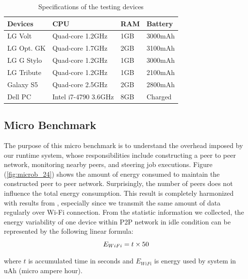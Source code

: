 \documentclass{sig-alternate}
\begin{document}
\begin{table}[h]
\caption{Specifications of the testing devices}
\label{table:devices}
\centering \small
\begin{tabular}{| l | l | l | l |}
    \hline
    \textbf{Devices} & \textbf{CPU} & \textbf{RAM} & \textbf{Battery} \\ \hline \hline
    LG Volt & Quad-core 1.2GHz & 1GB & 3000mAh\\ \hline
		LG Opt. GK & Quad-core 1.7GHz & 2GB & 3100mAh\\ \hline
		LG G Stylo & Quad-core 1.2GHz & 1GB & 3000mAh\\ \hline
		LG Tribute & Quad-core 1.2GHz & 1GB & 2100mAh\\ \hline
		Galaxy S5 & Quad-core 2.5GHz & 2GB & 2800mAh\\ \hline
		Dell PC & Intel i7-4790 3.6GHz & 8GB & Charged\\ \hline
\end{tabular}
\end{table}

\subsection{Micro Benchmark}
The purpose of this micro benchmark is to understand the overhead imposed by our runtime system, whose responsibilities include constructing a peer to peer network, monitoring nearby peers, and steering job executions. Figure (\ref{fig:microb_24}) shows the amount of energy consumed to maintain the constructed peer to peer network. Surprisingly, the number of peers does not influence the total energy consumption. This result is completely harmonized with results from \cite{wifi_energy}, especially since we transmit the same amount of data regularly over Wi-Fi connection. From the statistic information we collected, the energy variability of one device within P2P network in idle condition can be represented by the following linear formula:
\begin{equation} \small
\label{eq:wifi_overload}
E_{WiFi} = t \times 50
\end{equation}

\noindent 
where $t$ is accumulated time in seconds and $E_{WiFi}$ is energy used by system in uAh (micro ampere hour).
\end{document}
